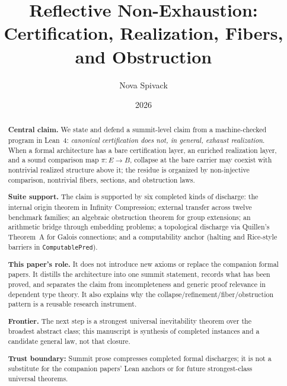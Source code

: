 \documentclass[11pt]{article}
\title{Reflective Non-Exhaustion:\\[0.35em]
\large Certification, Realization, Fibers, and Obstruction}
\author{Nova Spivack}
\date{2026}
\begin{document}
\maketitle
\NovaZenodoAfterTitle


\begin{abstract}
\raggedright
\textbf{Central claim.}
We state and defend a summit-level claim from a machine-checked program in Lean~4:
\emph{canonical certification does not, in general, exhaust realization}. When a
formal architecture has a bare certification layer, an enriched realization layer,
and a sound comparison map $\pi : E \to B$, collapse at the bare carrier may coexist
with nontrivial realized structure above it; the residue is organized by
non-injective comparison, nontrivial fibers, sections, and obstruction laws.

\textbf{Suite support.}
The claim is supported by six completed kinds of discharge: the internal origin
theorem in Infinity Compression; external transfer across twelve benchmark families;
an algebraic obstruction theorem for group extensions; an arithmetic bridge through
embedding problems; a topological discharge via Quillen's Theorem~A for Galois
connections; and a computability anchor (halting and Rice-style barriers in
\texttt{ComputablePred}).

\textbf{This paper's role.}
It does not introduce new axioms or replace the companion formal papers. It distills
the architecture into one summit statement, records what has been proved, and
separates the claim from incompleteness and generic proof relevance in dependent type
theory. It also explains why the collapse/refinement/fiber/obstruction pattern is a
reusable research instrument.

\textbf{Frontier.}
The next step is a strongest universal inevitability theorem over the broadest
abstract class; this manuscript is synthesis of completed instances and a candidate
general law, not that closure.

\textbf{Trust boundary:} Summit prose compresses completed formal discharges; it is not a substitute for the companion papers' Lean anchors or for future strongest-class universal theorems.
\end{abstract}


\end{document}
